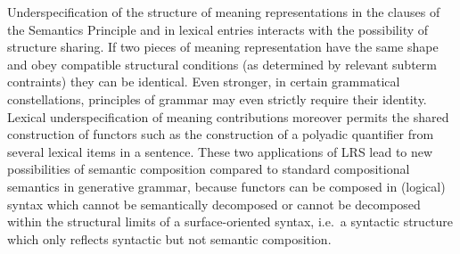 \documentclass[output=paper]{langsci/langscibook}
\begin{document}
Underspecification of the structure of meaning representations in the
clauses of the Semantics Principle and in lexical entries interacts
with the possibility of structure sharing. If two pieces of meaning
representation have the same shape and obey compatible structural
conditions (as determined by relevant subterm contraints) they can be
identical. Even stronger, in certain grammatical constellations,
principles of grammar may even strictly require their
identity. Lexical underspecification of meaning contributions moreover
permits the shared construction of functors such as the construction
of a polyadic quantifier from several lexical items in a
sentence. These two applications of LRS lead to new possibilities
of semantic composition compared to standard compositional semantics
in generative grammar, because functors can be composed in (logical) syntax
which cannot be semantically decomposed or cannot be decomposed within
the structural limits of a surface-oriented syntax, i.e.\ a syntactic
structure which only reflects syntactic but not semantic composition.

\end{document}
